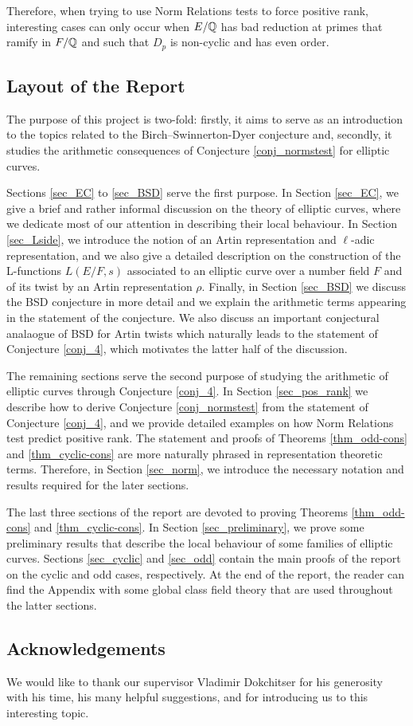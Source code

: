 Therefore, when trying to use Norm Relations tests to force positive rank, interesting cases can only occur when $E/\mathbb{Q}$ has bad reduction at primes that ramify in $F/\mathbb{Q}$ and such that $D_p$ is non-cyclic and has even order.

\subsection*{Layout of the Report}
The purpose of this project is two-fold: firstly, it aims to serve as an introduction to the topics related to the Birch--Swinnerton-Dyer conjecture and, secondly, it studies the arithmetic consequences of Conjecture \ref{conj_normstest} for elliptic curves.

Sections \ref{sec_EC} to \ref{sec_BSD} serve the first purpose. In Section \ref{sec_EC}, we give a brief and rather informal discussion on the theory of elliptic curves, where we dedicate most of our attention in describing their local behaviour. 
In Section \ref{sec_Lside}, we introduce the notion of an Artin representation and $\ell$-adic representation, and we also give a detailed description on the construction of the L-functions $L(E/F,s)$ associated to an elliptic curve over a number field $F$ and of its twist by an Artin representation $\rho$. Finally, in Section \ref{sec_BSD} we discuss the BSD conjecture in more detail and we explain the arithmetic terms appearing in the statement of the conjecture. We also discuss an important conjectural analaogue of BSD for Artin twists which naturally leads to the statement of Conjecture \ref{conj_4}, which motivates the latter half of the discussion.

The remaining sections serve the second purpose of studying the arithmetic of elliptic curves through Conjecture \ref{conj_4}. In Section \ref{sec_pos_rank} we describe how to derive Conjecture \ref{conj_normstest} from the statement of Conjecture \ref{conj_4}, and we provide detailed examples on how Norm Relations test predict positive rank. The statement and proofs of Theorems \ref{thm_odd-cons} and \ref{thm_cyclic-cons} are more naturally phrased in representation theoretic terms. Therefore, in Section \ref{sec_norm}, we introduce the necessary notation and results required for the later sections. 

The last three sections of the report are devoted to proving Theorems \ref{thm_odd-cons} and \ref{thm_cyclic-cons}. In Section \ref{sec_preliminary}, we prove some preliminary results that describe the local behaviour of some families of elliptic curves. Sections \ref{sec_cyclic} and \ref{sec_odd} contain the main proofs of the report on the cyclic and odd cases, respectively. At the end of the report, the reader can find the Appendix with some global class field theory that are used throughout the latter sections.

\subsection*{Acknowledgements}

We would like to thank our supervisor Vladimir Dokchitser for his generosity with his time, his many helpful suggestions, and for introducing us to this interesting topic.
